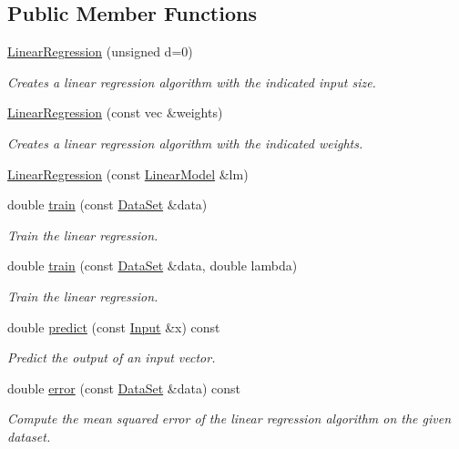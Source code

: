 \subsection*{Public Member Functions}
\begin{DoxyCompactItemize}
\item 
\hyperlink{classhappyml_1_1LinearRegression_aec943f0f85a5a99f41439b54ea2ac473}{Linear\+Regression} (unsigned d=0)
\begin{DoxyCompactList}\small\item\em Creates a linear regression algorithm with the indicated input size. \end{DoxyCompactList}\item 
\hyperlink{classhappyml_1_1LinearRegression_a1679264b5b2c992256cd3a8c1f98b02c}{Linear\+Regression} (const vec \&weights)
\begin{DoxyCompactList}\small\item\em Creates a linear regression algorithm with the indicated weights. \end{DoxyCompactList}\item 
\hyperlink{classhappyml_1_1LinearRegression_ac23946a5699a2f9ce5853e5e2ad10a4b}{Linear\+Regression} (const \hyperlink{classhappyml_1_1LinearModel}{Linear\+Model} \&lm)
\item 
double \hyperlink{classhappyml_1_1LinearRegression_a49a96b35d3f85a7ebd78fcc61c21f83e}{train} (const \hyperlink{classhappyml_1_1DataSet}{Data\+Set} \&data)
\begin{DoxyCompactList}\small\item\em Train the linear regression. \end{DoxyCompactList}\item 
double \hyperlink{classhappyml_1_1LinearRegression_ae707c7931a3be6d33108a34cdbb05422}{train} (const \hyperlink{classhappyml_1_1DataSet}{Data\+Set} \&data, double lambda)
\begin{DoxyCompactList}\small\item\em Train the linear regression. \end{DoxyCompactList}\item 
double \hyperlink{classhappyml_1_1LinearRegression_af7b493c394ab2664c5e743711a64d26e}{predict} (const \hyperlink{namespacehappyml_a03602d1ec49393790b8a0449f40cd01f}{Input} \&x) const 
\begin{DoxyCompactList}\small\item\em Predict the output of an input vector. \end{DoxyCompactList}\item 
double \hyperlink{classhappyml_1_1LinearRegression_aebb84fbdbfed7487c05baa8d8c1499e9}{error} (const \hyperlink{classhappyml_1_1DataSet}{Data\+Set} \&data) const 
\begin{DoxyCompactList}\small\item\em Compute the mean squared error of the linear regression algorithm on the given dataset. \end{DoxyCompactList}\end{DoxyCompactItemize}
